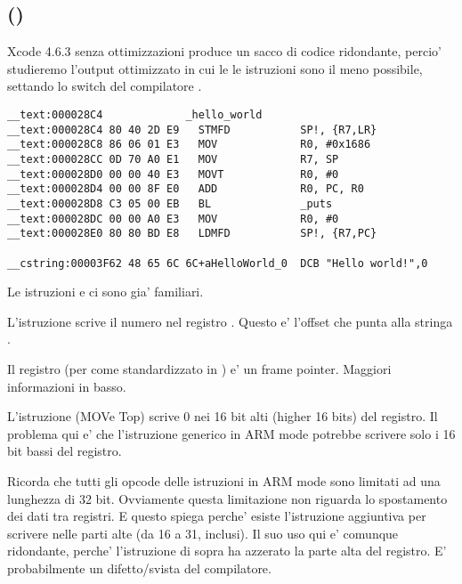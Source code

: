 \subsection{\OptimizingXcodeIV (\ARMMode)}

Xcode 4.6.3 senza ottimizzazioni produce un sacco di codice ridondante, percio' studieremo l'output ottimizzato in cui le 
le istruzioni sono il meno possibile, settando lo switch del compilatore \Othree.

\begin{lstlisting}[caption=\OptimizingXcodeIV (\ARMMode)]
__text:000028C4             _hello_world
__text:000028C4 80 40 2D E9   STMFD           SP!, {R7,LR}
__text:000028C8 86 06 01 E3   MOV             R0, #0x1686
__text:000028CC 0D 70 A0 E1   MOV             R7, SP
__text:000028D0 00 00 40 E3   MOVT            R0, #0
__text:000028D4 00 00 8F E0   ADD             R0, PC, R0
__text:000028D8 C3 05 00 EB   BL              _puts
__text:000028DC 00 00 A0 E3   MOV             R0, #0
__text:000028E0 80 80 BD E8   LDMFD           SP!, {R7,PC}

__cstring:00003F62 48 65 6C 6C+aHelloWorld_0  DCB "Hello world!",0
\end{lstlisting}

Le istruzioni  e  ci sono gia' familiari.


L'istruzione \MOV scrive il numero  nel registro  .
Questo e' l'offset che punta alla stringa  .

Il registro  (per come standardizzato in \cite{IOSABI}) e' un frame pointer. Maggiori informazioni in basso.

L'istruzione  (MOVe Top) scrive 0 nei 16 bit alti (higher 16 bits) del registro.
Il problema qui e' che l'istruzione generico \MOV in ARM mode potrebbe scrivere solo i 16 bit bassi del registro.

Ricorda che tutti gli opcode delle istruzioni in ARM mode sono limitati ad una lunghezza di 32 bit. Ovviamente questa limitazione non riguarda lo spostamento dei dati tra registri.
E questo spiega perche' esiste l'istruzione aggiuntiva  per scrivere nelle parti alte (da 16 a 31, inclusi).
Il suo uso qui e' comunque ridondante, perche' l'istruzione  di sopra ha azzerato la parte alta del registro.
E' probabilmente un difetto/svista del compilatore.

